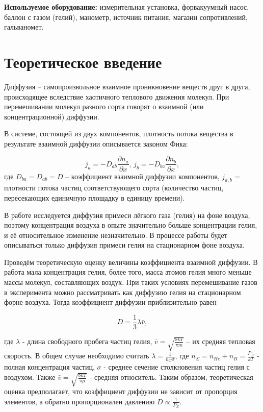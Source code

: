 \documentclass[a4paper, 12pt]{article} %
\begin{document}
\textbf{Используемое оборудование:} измерительная установка, форвакуумный насос, баллон с газом (гелий), манометр, источник питания, магазин сопротивлений, гальваномет.

\section{Теоретическое введение}

Диффузия -- самопроизвольное взаимное проникновение веществ друг в друга, происходящее вследствие хаотичного теплового движения молекул. При перемешивании молекул разного сорта говорят о взаимной (или концентрационной) диффузии.

В системе, состоящей из двух компонентов, плотность потока вещества в результате взаимной диффузии описывается законом Фика:

\begin{equation}
    j_a = -D_{ab} \frac{\partial n_a}{\partial x} \text{, }j_b = -D_{ba} \frac{\partial n_b}{\partial x},
\end{equation}
где $D_{ba} = D_{ab} = D$ -- коэффициент взаимной диффузии компонентов, $j_{a,b}$ = плотности потока частиц соответствующего сорта (количество частиц, пересекающих единичную площадку в единицу времени).


В работе исследуется диффузия примеси лёгкого газа (гелия) на фоне воздуха, поэтому концентрация воздуха в опыте значительно больше концентрации гелия, и её относительное изменение незначительно. В процессе работы будет описываться только диффузия примеси гелия на стационарном фоне воздуха.

Проведём теоретическую оценку величины коэффициента взаимной диффузии. В работа мала концентрация гелия, более того, масса атомов гелия много меньше массы молекул, составляющих воздух. При таких условиях перемешивание газов в эксперимента можно рассматривать как диффузию гелия на стационарном форне воздуха. Тогда коэффициент диффузии приблизительно равен

\begin{equation}
    D = \frac{1}{3}\lambda \bar v,
\end{equation}

где $\lambda$ - длина свободного пробега частиц гелия, $\bar v = \sqrt{\frac{8kT}{\pi m}}$ -- их средняя тепловая скорость. В общем случае необходимо считать $\lambda = \frac{1}{n_\Sigma \sigma}$, где $n_\Sigma = n_{He} + n_B = \frac{P_\Sigma}{kT}$ - полная концентрация частиц, $\sigma$ -  среднее сечение столкновения частиц гелия с воздухом. Также  $\bar v = \sqrt{\frac{8kT}{\pi \mu}}$ - средняя относитель. Таким образом, теоретическая оценка предполагает, что коэффициент диффузии не зависит от пропорция элементов, а обратно пропорционален давлению $D \propto \frac{1}{P_\Sigma}$.
\end{document}
